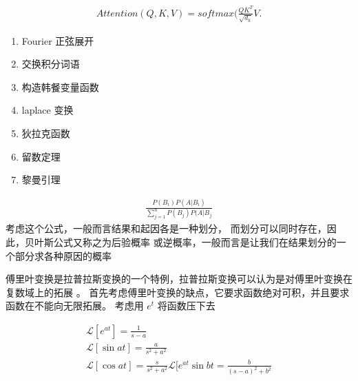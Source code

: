 \begin{thm}
		\begin{align*}
				Attention(Q,K,V) = softmax (\frac{QK^T}{\sqrt{d_k} } V
		.\end{align*}
\end{thm}
\begin{thm}[关于积分的菜谱]
		\begin{enumerate}
				\item Fourier 正弦展开
				\item 交换积分词语
				\item 构造韩餐变量函数
				\item laplace 变换
				\item 狄拉克函数
				\item 留数定理
				\item 黎曼引理
		\end{enumerate}
\end{thm}
\begin{thm}
\begin{align*}
		\frac{P(B_i)P(A | B_i)}{\sum_{j=1}^{n} P(B_j) P(A|B_j} 
\end{align*}
考虑这个公式，一般而言结果和起因各是一种划分，
而划分可以同时存在，因此，贝叶斯公式又称之为后验概率
或逆概率，一般而言是让我们在结果划分的一个部分求各种原因的概率
\end{thm}
\begin{thm}
傅里叶变换是拉普拉斯变换的一个特例，拉普拉斯变换可以认为是对傅里叶变换在复数域上的拓展
。
首先考虑傅里叶变换的缺点，它要求函数绝对可积，并且要求函数在不能向无限拓展。
考虑用 $ e^{t} $ 将函数压下去

\begin{align*}
		\mathscr{L}[e^{at}] = \frac{1}{s-a} \\
		\mathscr{L}[\sin  at] = \frac{a}{s^2+a^2} \\
		\mathscr{L}[\cos at ]  = \frac{s}{s^2+a^2} 
		\mathscr{L}[e^{at}\sin bt =  \frac{b}{(s-a)^2 + b^2}  
\end{align*}
\end{thm}

\ifx\allfiles\undefined

\fi

